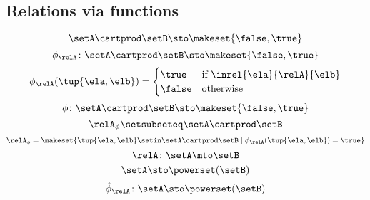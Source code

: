 {\begin{forslides}
        \subsection{Relations via functions}

        \begin{equation}
            \label{eq:slides_session2_rel_110}
            \setA \cartprod \setB \sto \makeset{ \false, \true }
        \end{equation}
        \begin{equation}
            \label{eq:slides_session2_rel_111}
            \phi_{\relA} \colon \setA \cartprod \setB \sto \makeset{ \false, \true }
        \end{equation}
        \begin{equation}
            \label{eq:slides_session2_rel_112}
            \phi_{\relA}(\tup{\ela, \elb}) =
            \begin{cases}
                \true  & \text{if } \inrel{\ela}{\relA}{\elb} \\
                \false & \text{otherwise}
            \end{cases}
        \end{equation}
        \begin{equation}
            \label{eq:slides_session2_rel_113}
            \phi\colon \setA \cartprod \setB \sto \makeset{ \false, \true }
        \end{equation}
        \begin{equation}
            \label{eq:slides_session2_rel_114}
            \relA_{\phi} \setsubseteq \setA \cartprod \setB
        \end{equation}
        \begin{equation}
            \label{eq:slides_session2_rel_115}
            \relA_{\phi} = \makeset{ \tup{\ela, \elb} \setin \setA \cartprod \setB \mid \phi_{\relA}(\tup{\ela, \elb}) = \true }
        \end{equation}
        \begin{equation}
            \label{eq:slides_session2_rel_116}
            \relA \colon \setA \mto \setB
        \end{equation}
        \begin{equation}
            \label{eq:slides_session2_rel_117}
            \setA  \sto \powerset (\setB)
        \end{equation}
        \begin{equation}
            \label{eq:slides_session2_rel_118}
            \hat \phi_{\relA} \colon \setA \sto \powerset (\setB)

\end{equation}
\end{forslides}}

